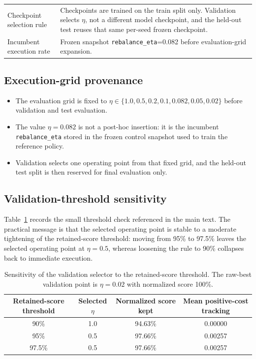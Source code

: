 \documentclass[10pt,twocolumn]{article}
\begin{document}
\begin{table}[t]
\begin{tabular}{@{}p{}p{}@{}}
Checkpoint selection rule & Checkpoints are trained on the train split only. Validation selects $\eta$, not a different model checkpoint, and the held-out test reuses that same per-seed frozen checkpoint. \\
Incumbent execution rate & Frozen snapshot \texttt{rebalance\_eta}=0.082 before evaluation-grid expansion. \\
\bottomrule
\end{tabular}
\end{table}

\subsection{Execution-grid provenance}
\begin{itemize}[leftmargin=*,itemsep=1pt]
\item The evaluation grid is fixed to $\eta\in\{1.0, 0.5, 0.2, 0.1, 0.082, 0.05, 0.02\}$ before validation and test evaluation.
\item The value $\eta=0.082$ is not a post-hoc insertion: it is the incumbent \texttt{rebalance\_eta} stored in the frozen control snapshot used to train the reference policy.
\item Validation selects one operating point from that fixed grid, and the held-out test split is then reserved for final evaluation only.
\end{itemize}

\subsection{Validation-threshold sensitivity}
Table~\ref{tab:threshold_sensitivity} records the small threshold check referenced in the main text. The practical message is that the selected operating point is stable to a moderate tightening of the retained-score threshold: moving from 95\% to 97.5\% leaves the selected operating point at $\eta=0.5$, whereas loosening the rule to 90\% collapses back to immediate execution.

\begin{table}[H]
\centering
\small
\caption{Sensitivity of the validation selector to the retained-score threshold. The raw-best validation point is $\eta=0.02$ with normalized score 100\%.}
\label{tab:threshold_sensitivity}
\begin{tabular}{@{}cccc@{}}
\toprule
Retained-score threshold & Selected $\eta$ & Normalized score kept & Mean positive-cost tracking \\
\midrule
90\% & 1.0 & 94.63\% & 0.00000 \\
95\% & 0.5 & 97.66\% & 0.00257 \\
97.5\% & 0.5 & 97.66\% & 0.00257 \\
\bottomrule
\end{tabular}
\end{table}
\end{document}
